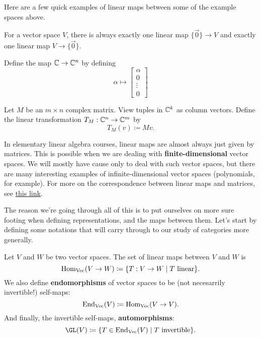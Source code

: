 Here are a few quick examples of linear maps between some of the example spaces above.

\begin{example}[Trivial]
    For a vector space $V$, there is always exactly one linear map $\{\vec{0}\} \to V$ and 
    exactly one linear map $V \to \{\vec{0}\}$.
\end{example}

\begin{example}[Embedding]
    Define the map $\mathbb{C} \to \mathbb{C}^n$ by defining
    \[
        \alpha \mapsto \begin{bmatrix}
            \alpha \\
            0 \\ \vdots \\ 0
        \end{bmatrix}
    \]
\end{example}

\begin{example}[Matrix]
    Let $M$ be an $m\times n$ complex matrix.
    View tuples in $\mathbb{C}^k$ as column vectors.
    Define the linear transformation $T_M:\mathbb{C}^n \to \mathbb{C}^m$ by
    \[
        T_M(v) \coloneq Mv.
    \]
\end{example}

In elementary linear algebra courses, linear maps are almost always just given by matrices.
This is possible when we are dealing with {\bf finite-dimensional} vector spaces.
We will mostly have cause only to deal with such vector spaces, but there are many interesting 
examples of infinite-dimensional vector spaces (polynomials, for example).
For more on the correspondence between linear maps and matrices, see 
\href{https://math.libretexts.org/Bookshelves/Linear_Algebra/Book%3A_Linear_Algebra_(Schilling_Nachtergaele_and_Lankham)/06%3A_Linear_Maps/6.06%3A_The_matrix_of_a_linear_map}{this link}.

The reason we're going through all of this is to put ourselves on more sure footing when defining representations,
and the maps between them. 
Let's start by defining some notations that will carry through to our study of categories more generally.

\begin{definition}
    Let $V$ and $W$ be two vector spaces.
    The set of linear maps between $V$ and $W$ is 
    \[
         \operatorname{Hom}_{\operatorname{Vec}}(V\to W) \coloneq \{ T:V\to W \mid \text{$T$ linear} \}.
    \]
    We also define {\bf endomorphisms} of vector spaces to be (not necesarrily invertible!)
    self-maps:
    \[
        \operatorname{End}_{\operatorname{Vec}}(V) \coloneq \operatorname{Hom}_{\operatorname{Vec}}(V\to V).
    \]
    And finally, the invertible self-maps, {\bf automorphisms}:
    \[
        \GL(V) \coloneq \{ T\in\End_{\Vecc}(V) \mid \text{$T$ invertible} \}.
    \]
\end{definition}

